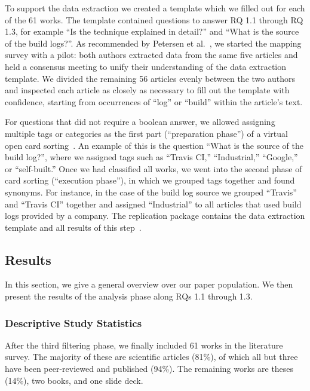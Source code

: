 To support the data extraction we created a template which we filled out
for each of the 61 works.
The template contained questions to answer RQ 1.1 through RQ 1.3,
for example ``Is the technique explained in detail?'' and
``What is the source of the build logs?''.
As recommended by Petersen et
al.~\cite{petersen2015guidelines}, we started the mapping survey with a
pilot:
both authors extracted data from the same five articles and held a
consensus meeting to unify their understanding
of the data extraction template.
We divided the remaining 56 articles evenly between the two authors
and inspected each article as closely as necessary to fill out the
template
with confidence,
starting from occurrences of ``log'' or ``build'' within the article's
text.

For questions that did not require a boolean answer, we allowed assigning
multiple tags or categories as the first part (``preparation phase'')
of a virtual open card sorting~\cite{zimmermann2016card}.
An example of this is the question ``What is the source of the build
log?'',
where we assigned tags such as ``Travis CI,''
``Industrial,'' ``Google,'' or
``self-built.''
Once we had classified all works, we went into the second phase of
card sorting
(``execution phase''), in which we grouped tags
together and found synonyms.
For instance, in the case of the build log source we grouped
``Travis'' and ``Travis CI'' together and assigned ``Industrial'' to
all articles that used build logs provided by a company.
The replication package contains the data extraction template and all
results of this step~\cite{brandt2020chunk-replication}.


\subsection{Results}
\addtolength{\tabcolsep}{-5pt}

In this section, we give a general overview over our paper population.
We then present the results of the analysis phase along RQs 1.1 through
1.3.


\subsubsection{Descriptive Study Statistics}
After the third filtering phase, we finally included 61 works in the literature survey. The majority of these are scientific articles (81\%), of which all but three have been peer-reviewed and published (94\%). The remaining works are theses (14\%), two books, and one slide deck.

